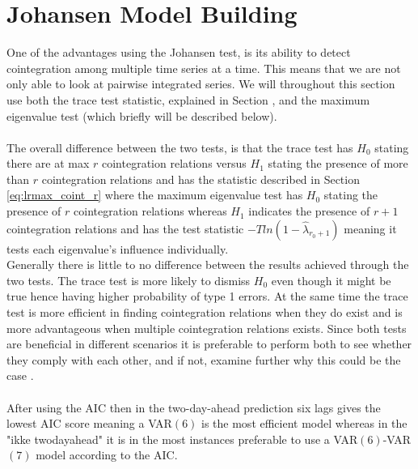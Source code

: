 \section{Johansen Model Building}
One of the advantages using the Johansen test, is its ability to detect cointegration among multiple time series at a time. This means that we are not only able to look at pairwise integrated series. We will throughout this section use both the trace test statistic, explained in Section \cite{Johansen_test}, and the maximum eigenvalue test (which briefly will be described below). \\\\
The overall difference between the two tests, is that the trace test has $H_0$ stating there are at max $r$ cointegration relations versus $H_1$ stating the presence of more than $r$ cointegration relations and has the statistic described in Section \cite{Johansen_test} \eqref{eq:lrmax_coint_r} where the maximum eigenvalue test has $H_0$ stating the presence of $r$ cointegration relations whereas $H_1$ indicates the presence of $r+1$ cointegration relations and has the test statistic $-Tln(1-\hat{\lambda}_{r_0+1})$ meaning it tests each eigenvalue's influence individually.\\
Generally there is little to no difference between the results achieved through the two tests. The trace test is more likely to dismiss $H_0$ even though it might be true hence having higher probability of type 1 errors. At the same time the trace test is more efficient in finding cointegration relations when they do exist and is more advantageous when multiple cointegration relations exists. Since both tests are beneficial in different scenarios it is preferable to perform both to see whether they comply with each other, and if not, examine further why this could be the case \citep{johansentestdifferences}.\\\\
After using the AIC then in the two-day-ahead prediction six lags gives the lowest AIC score meaning a VAR$(6)$ is the most efficient model whereas in the "ikke twodayahead" it is in the most instances preferable to use a VAR$(6)$-VAR$(7)$ model according to the AIC.


